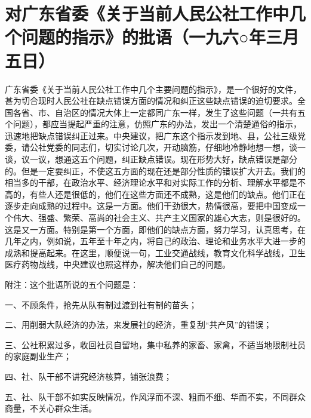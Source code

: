 \section[对广东省委《关于当前人民公社工作中几个问题的指示》的批语（一九六○年三月五日）]{对广东省委《关于当前人民公社工作中几个问题的指示》的批语（一九六○年三月五日）}


广东省委《关于当前人民公社工作中几个主要问题的指示》，是一个很好的文件，甚为切合现时人民公社在缺点错误方面的情况和纠正这些缺点错误的迫切要求。全国各省、市、自治区的情况大体上一定都同广东一样，发生了这些问题（一共有五个问题），都应当提起严重的注意，仿照广东的办法，发出一个清楚通俗的指示，迅速地把缺点错误纠正过来。中央建议，把广东这个指示发到地、县，公社三级党委，请公社党委的同志们，切实讨论几次，开动脑筋，仔细地冷静地想一想，谈一谈，议一议，想通这五个问题，纠正缺点错误。现在形势大好，缺点错误是部分的。但是一定要纠正，不使这五方面的现在还是部分性质的错误扩大开去。我们的相当多的干部，在政治水平、经济理论水平和对实际工作的分析、理解水平都是不高的，有些人还是很低的，他们在这些方面还不成熟，这是他们的缺点。他们正在逐步走向成熟的过程中。这是一方面。他们干劲很大，热情很高，要把中国变成一个伟大、强盛、繁荣、高尚的社会主义、共产主义国家的雄心大志，则是很好的。这是又一方面。特别是第一个方面，即他们的缺点方面，努力学习，认真思考，在几年之内，例如说，五年至十年之内，将自己的政治、理论和业务水平大进一步的成熟和提高起来。在这里，顺便说一句，工业交通战线，教育文化科学战线，卫生医疗药物战线，中央建议也照这样办，解决他们自己的问题。

附注：这个批语所说的五个问题是：

一、不顾条件，抢先从队有制过渡到社有制的苗头；

二、用削弱大队经济的办法，来发展社的经济，重复刮“共产风”的错误；

三、公社积累过多，收回社员自留地，集中私养的家畜、家禽，不适当地限制社员的家庭副业生产；

四、社、队干部不讲究经济核算，铺张浪费；

五、社、队干部不如实反映情况，作风浮而不深、粗而不细、华而不实，不同群众商量，不关心群众生活。


